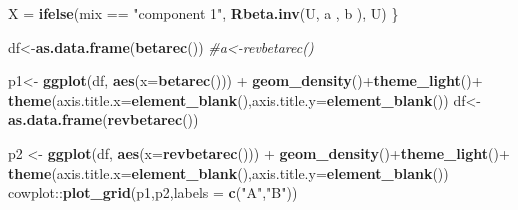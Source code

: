 \documentclass[12pt,twoside, a4paper]{reedthesis}
\newenvironment{Shaded}{}{}
\newcommand{\CommentTok}[1]{\textcolor[rgb]{0.38,0.63,0.69}{\textit{#1}}}
\newcommand{\DataTypeTok}[1]{\textcolor[rgb]{0.56,0.13,0.00}{#1}}
\newcommand{\KeywordTok}[1]{\textcolor[rgb]{0.00,0.44,0.13}{\textbf{#1}}}
\newcommand{\NormalTok}[1]{#1}
\newcommand{\OperatorTok}[1]{\textcolor[rgb]{0.40,0.40,0.40}{#1}}
\newcommand{\StringTok}[1]{\textcolor[rgb]{0.25,0.44,0.63}{#1}}
\begin{document}
\begin{Shaded}
\begin{Highlighting}[]
\NormalTok{  X =}\StringTok{ }\KeywordTok{ifelse}\NormalTok{(mix }\OperatorTok{==}\StringTok{ "component 1"}\NormalTok{, }\KeywordTok{Rbeta.inv}\NormalTok{(U, a , b ), U)}
\NormalTok{\}}

\NormalTok{df<-}\KeywordTok{as.data.frame}\NormalTok{(}\KeywordTok{betarec}\NormalTok{())}
\CommentTok{#a<-revbetarec()}

\NormalTok{p1<-}\StringTok{ }\KeywordTok{ggplot}\NormalTok{(df, }\KeywordTok{aes}\NormalTok{(}\DataTypeTok{x=}\KeywordTok{betarec}\NormalTok{())) }\OperatorTok{+}\StringTok{ }
\StringTok{  }\KeywordTok{geom_density}\NormalTok{()}\OperatorTok{+}\KeywordTok{theme_light}\NormalTok{()}\OperatorTok{+}
\StringTok{  }\KeywordTok{theme}\NormalTok{(}\DataTypeTok{axis.title.x=}\KeywordTok{element_blank}\NormalTok{(),}\DataTypeTok{axis.title.y=}\KeywordTok{element_blank}\NormalTok{())}
\NormalTok{df<-}\KeywordTok{as.data.frame}\NormalTok{(}\KeywordTok{revbetarec}\NormalTok{())}

\NormalTok{p2 <-}\StringTok{ }\KeywordTok{ggplot}\NormalTok{(df, }\KeywordTok{aes}\NormalTok{(}\DataTypeTok{x=}\KeywordTok{revbetarec}\NormalTok{())) }\OperatorTok{+}\StringTok{ }
\StringTok{  }\KeywordTok{geom_density}\NormalTok{()}\OperatorTok{+}\KeywordTok{theme_light}\NormalTok{()}\OperatorTok{+}
\StringTok{  }\KeywordTok{theme}\NormalTok{(}\DataTypeTok{axis.title.x=}\KeywordTok{element_blank}\NormalTok{(),}\DataTypeTok{axis.title.y=}\KeywordTok{element_blank}\NormalTok{())}
\NormalTok{cowplot}\OperatorTok{::}\KeywordTok{plot_grid}\NormalTok{(p1,p2,}\DataTypeTok{labels =} \KeywordTok{c}\NormalTok{(}\StringTok{"A"}\NormalTok{,}\StringTok{"B"}\NormalTok{))}
\end{Highlighting}
\end{Shaded}
\end{document}
